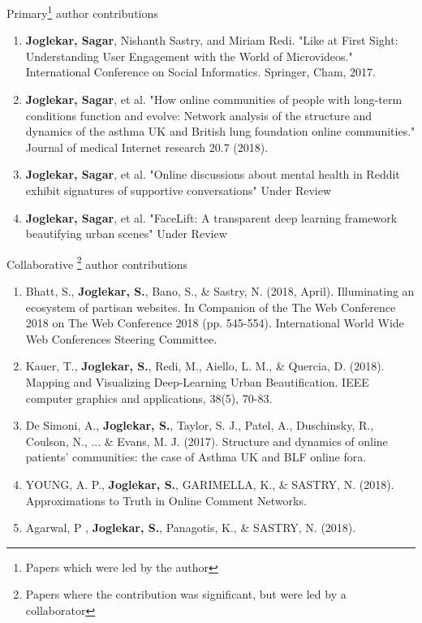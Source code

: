 Primary\footnote{Papers which were led by the author} author contributions
\begin{enumerate}
    \item \textbf{Joglekar, Sagar}, Nishanth Sastry, and Miriam Redi. "Like at First Sight: Understanding User Engagement with the World of Microvideos." International Conference on Social Informatics. Springer, Cham, 2017.
    
    \item \textbf{Joglekar, Sagar}, et al. "How online communities of people with long-term conditions function and evolve: Network analysis of the structure and dynamics of the asthma UK and British lung foundation online communities." Journal of medical Internet research 20.7 (2018).
    
    \item \textbf{Joglekar, Sagar}, et al. "Online discussions about mental health in Reddit exhibit signatures of supportive conversations" Under Review
    
    \item \textbf{Joglekar, Sagar}, et al. "FaceLift: A transparent deep learning framework beautifying urban scenes" Under Review
    
\end{enumerate}

Collaborative \footnote{Papers where the contribution was significant, but were led by a collaborator} author contributions

\begin{enumerate}
    \item Bhatt, S., \textbf{Joglekar, S.}, Bano, S., \& Sastry, N. (2018, April). Illuminating an ecosystem of partisan websites. In Companion of the The Web Conference 2018 on The Web Conference 2018 (pp. 545-554). International World Wide Web Conferences Steering Committee.
    
    \item Kauer, T., \textbf{Joglekar, S.}, Redi, M., Aiello, L. M., \& Quercia, D. (2018). Mapping and Visualizing Deep-Learning Urban Beautification. IEEE computer graphics and applications, 38(5), 70-83.
    
    \item De Simoni, A., \textbf{Joglekar, S.}, Taylor, S. J., Patel, A., Duschinsky, R., Coulson, N., ... \& Evans, M. J. (2017). Structure and dynamics of online patients’ communities: the case of Asthma UK and BLF online fora.
    
    \item YOUNG, A. P., \textbf{Joglekar, S.}, GARIMELLA, K., \& SASTRY, N. (2018). Approximations to Truth in Online Comment Networks.
    
    \item Agarwal, P , \textbf{Joglekar, S.}, Panagotis, K., \& SASTRY, N. (2018).


\end{enumerate}









